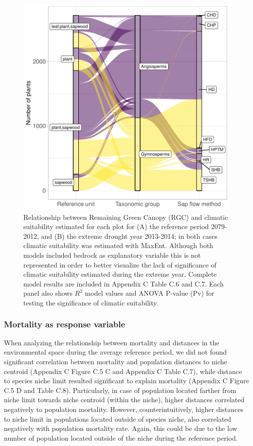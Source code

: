 \documentclass[11pt,twoside]{reedthesis}
\begin{document}
\setlength{\abovecaptionskip}{10pt}
\begin{figure}[hbt!]

{\centering \includegraphics[width=0.5\linewidth]{figure/CH3/figure4} 

}

\caption[Relationship between Remaining Green Canopy (RGC) and population climatic suitability]{Relationship between Remaining Green Canopy (RGC) and climatic suitability estimated for each plot for (A) the reference period 2079-2012, and (B) the extreme drought year 2013-2014; in both cases climatic suitability was estimated with MaxEnt.  Although both models included bedrock as explanatory variable this is not represented in order to better visualize the lack of significance of climatic suitability estimated during the extreme year. Complete model results are included in Appendix C Table C.6 and C.7. Each panel also shows $R^2$ model values and ANOVA P-value (Pv) for testing the significance of climatic suitability.}\label{fig:Ch3plot4}
\end{figure}
\subsubsection{Mortality as response
variable}\label{mortality-as-response-variable}

When analyzing the relationship between mortality and distances in the
environmental space during the average reference period, we did not
found significant correlation between mortality and population distances
to niche centroid (Appendix C Figure C.5 C and Appendix C Table C.7),
while distance to species niche limit resulted significant to explain
mortality (Appendix C Figure C.5 D and Table C.8). Particularly, in case
of population located farther from niche limit towards niche centroid
(within the niche), higher distances correlated negatively to population
mortality. However, counterintuitively, higher distances to niche limit
in populations located outside of species niche, also correlated
negatively with population mortality rate. Again, this could be due to
the low number of population located outside of the niche during the
reference period. \par
\end{document}
